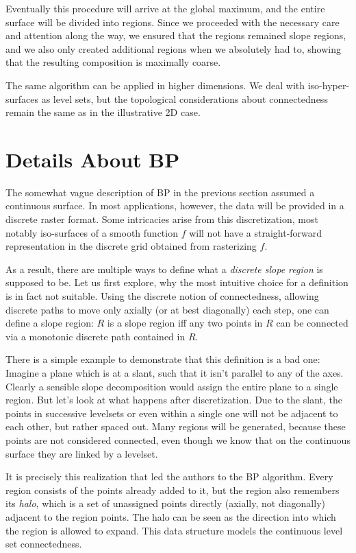 \documentclass[a4paper,12pt,notitlepage,fullpage]{paper}
\theoremstyle{plain}
\theoremstyle{definition}
\begin{document}
Eventually this procedure will arrive at the global maximum, and the entire surface will be divided into regions. Since we proceeded with the necessary care and attention along the way, we ensured that the regions remained slope regions, and we also only created additional regions when we absolutely had to, showing that the resulting composition is maximally coarse.

The same algorithm can be applied in higher dimensions. We deal with iso-hyper-surfaces as level sets, but the topological considerations about connectedness remain the same as in the illustrative 2D case.

\section{Details About BP}
The somewhat vague description of BP in the previous section assumed a continuous surface. In most applications, however, the data will be provided in a discrete raster format. Some intricacies arise from this discretization, most notably iso-surfaces of a smooth function $f$ will not have a straight-forward representation in the discrete grid obtained from rasterizing $f$.

As a result, there are multiple ways to define what a \emph{discrete slope region} is supposed to be.
Let us first explore, why the most intuitive choice for a definition is in fact not suitable.
Using the discrete notion of connectedness, allowing discrete paths to move only axially (or at best diagonally) each step, one can define a slope region:
$R$ is a slope region iff any two points in $R$ can be connected via a monotonic discrete path contained in $R$.

There is a simple example to demonstrate that this definition is a bad one: Imagine a plane which is at a slant, such that it isn't parallel to any of the axes. Clearly a sensible slope decomposition would assign the entire plane to a single region.
But let's look at what happens after discretization.
Due to the slant, the points in successive levelsets or even within a single one will not be adjacent to each other, but rather spaced out.
Many regions will be generated, because these points are not considered connected, even though we know that on the continuous surface they are linked by a levelset.

It is precisely this realization that led the authors to the BP algorithm. Every region consists of the points already added to it, but the region also remembers its \emph{halo}, which is a set of unassigned points directly (axially, not diagonally) adjacent to the region points. The halo can be seen as the direction into which the region is allowed to expand. This data structure models the continuous level set connectedness.
\end{document}
